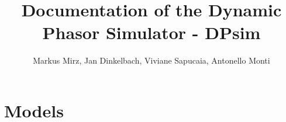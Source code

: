 \documentclass{report}
\title{Documentation of the Dynamic Phasor Simulator - DPsim}
\author{Markus Mirz, Jan Dinkelbach, Viviane Sapucaia, Antonello Monti}
\begin{document}
\maketitle

\tableofcontents


 




\chapter{Models}







 


\end{document}
